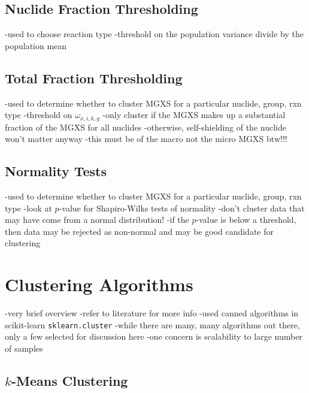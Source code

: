 \subsection{Nuclide Fraction Thresholding}
\label{subsec:chap10-litmus-nuc-frac}

-used to choose reaction type
-threshold on the population variance divide by the population mean

\subsection{Total Fraction Thresholding}
\label{subsec:chap10-litmus-tot-frac}

-used to determine whether to cluster MGXS for a particular nuclide, group, rxn type
-threshold on $\omega_{x,i,k,g}$
  -only cluster if the MGXS makes up a substantial fraction of the MGXS for all nuclides
  -otherwise, self-shielding of the nuclide won't matter anyway
  -this must be of the macro not the micro MGXS btw!!!

\subsection{Normality Tests}
\label{subsec:chap10-litmus-normality}

-used to determine whether to cluster MGXS for a particular nuclide, group, rxn type
-look at $p$-value for Shapiro-Wilks tests of normality
-don't cluster data that may have come from a normal distribution!
-if the $p$-value is below a threshold, then data may be rejected as non-normal and may be good candidate for clustering



\section{Clustering Algorithms}
\label{subsec:chap10-clustering}

-very brief overview
-refer to literature for more info
-used canned algorithms in scikit-learn \texttt{sklearn.cluster}
-while there are many, many algorithms out there, only a few selected for discussion here
  -one concern is scalability to large number of samples

\subsection{$k$-Means Clustering}
\label{subsec:chap10-kmeans}

